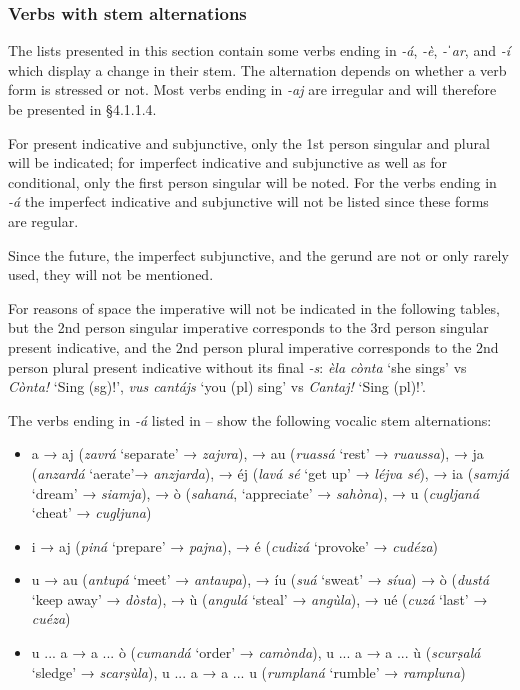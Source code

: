 \subsubsection{Verbs with stem alternations}
The lists presented in this section contain some verbs ending in \textit{-á}, \textit{-è}, \textit{-ˈar}, and \textit{-í} which display a change in their stem. The alternation depends on whether a verb form is stressed or not. Most verbs ending in \textit{-aj} are irregular and will therefore be presented in §4.1.1.4.

For present indicative and subjunctive, only the 1st person singular and plural will be indicated; for imperfect indicative and subjunctive as well as for conditional, only the first person singular will be noted. For the verbs ending in \textit{-á} the imperfect indicative and subjunctive will not be listed since these forms are regular.

Since the future, the imperfect subjunctive, and the gerund are not or only rarely used, they will not be mentioned.

For reasons of space the imperative will not be indicated in the following tables, but the 2nd person singular imperative corresponds to the 3rd person singular present indicative, and the 2nd person plural imperative corresponds to the 2nd person plural present indicative without its final \textit{-s}: \textit{èla cònta} `she sings' vs \textit{Cònta!} `Sing (sg)!', \textit{vus cantájs} `you (pl) sing' vs \textit{Cantaj!} `Sing (pl)!'.

The verbs ending in \textit{-á} listed in  --  show the following vocalic stem alternations:

\begin{itemize}
	\item a → aj (\textit{zavrá} `separate' → \textit{zajvra}), → au (\textit{ruassá} `rest' → \textit{ruaussa}), → ja (\textit{anzardá} `aerate'→ \textit{anzjarda}), → éj (\textit{lavá sé} `get up' → \textit{léjva sé}), → ia (\textit{samjá} `dream' → \textit{siamja}), → ò (\textit{sahaná},  `appreciate' → \textit{sahòna}), → u (\textit{cugljaná} `cheat' → \textit{cugljuna})
	\item i → aj (\textit{piná} `prepare' → \textit{pajna}), → é (\textit{cudizá} `provoke' → \textit{cudéza})
	\item u → au (\textit{antupá} `meet' → \textit{antaupa}), → íu (\textit{suá} `sweat' → \textit{síua}) → ò (\textit{dustá} `keep away' → \textit{dòsta}), → ù (\textit{angulá} `steal' → \textit{angùla}), → ué (\textit{cuzá} `last' → \textit{cuéza})
	\item u ... a → a ... ò (\textit{cumandá} `order' → \textit{camònda}), u ... a → a ... ù (\textit{scurṣalá} `sledge' → \textit{scarṣùla}), u ... a → a ... u (\textit{rumplaná} `rumble' → \textit{rampluna})
\end{itemize}

